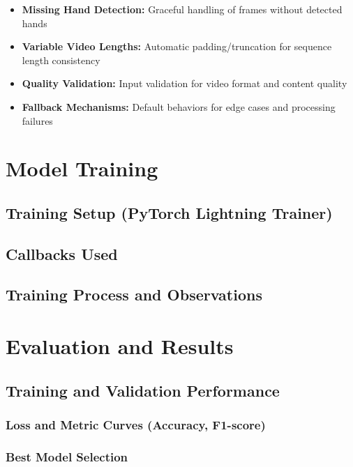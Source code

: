 \documentclass[11pt, a4paper]{article}
\begin{document}
\begin{itemize}
    \item \textbf{Missing Hand Detection:} Graceful handling of frames without detected hands
    \item \textbf{Variable Video Lengths:} Automatic padding/truncation for sequence length consistency
    \item \textbf{Quality Validation:} Input validation for video format and content quality
    \item \textbf{Fallback Mechanisms:} Default behaviors for edge cases and processing failures
\end{itemize}

\section{Model Training}
    \subsection{Training Setup (PyTorch Lightning Trainer)}
    \subsection{Callbacks Used}
    \subsection{Training Process and Observations}

\section{Evaluation and Results}
    \subsection{Training and Validation Performance}
        \subsubsection{Loss and Metric Curves (Accuracy, F1-score)}
        \subsubsection{Best Model Selection}
\end{document}
